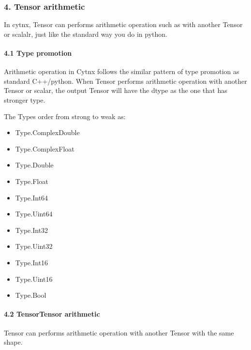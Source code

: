 \documentclass[letterpaper,10pt,english]{sphinxmanual}
\begin{document}
\subsubsection{4. Tensor arithmetic}
\label{\detokenize{guide/basic_obj/Tensor_4_arithmetic:tensor-arithmetic}}\label{\detokenize{guide/basic_obj/Tensor_4_arithmetic::doc}}
In cytnx, Tensor can performs arithmetic operation such as  with another Tensor or scalalr, just like the standard way you do in python.


\paragraph{4.1 Type promotion}
\label{\detokenize{guide/basic_obj/Tensor_4_arithmetic:type-promotion}}
Arithmetic operation in Cytnx follows the similar pattern of type promotion as standard C++/python.
When Tensor performs arithmetic operation with another Tensor or scalar, the output Tensor will have the dtype as the one that has stronger type.

The Types order from strong to weak as:
\begin{itemize}
\item {} 
Type.ComplexDouble

\item {} 
Type.ComplexFloat

\item {} 
Type.Double

\item {} 
Type.Float

\item {} 
Type.Int64

\item {} 
Type.Uint64

\item {} 
Type.Int32

\item {} 
Type.Uint32

\item {} 
Type.Int16

\item {} 
Type.Uint16

\item {} 
Type.Bool

\end{itemize}


\paragraph{4.2 Tensor\sphinxhyphen{}Tensor arithmetic}
\label{\detokenize{guide/basic_obj/Tensor_4_arithmetic:tensor-tensor-arithmetic}}
Tensor can performs arithmetic operation with another Tensor with the same shape.
\end{document}
